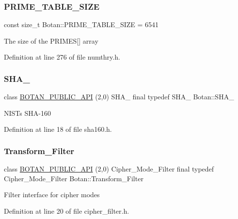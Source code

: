 \subsubsection{\texorpdfstring{P\+R\+I\+M\+E\+\_\+\+T\+A\+B\+L\+E\+\_\+\+S\+I\+ZE}{PRIME\_TABLE\_SIZE}}
{\footnotesize\ttfamily const size\+\_\+t Botan\+::\+P\+R\+I\+M\+E\+\_\+\+T\+A\+B\+L\+E\+\_\+\+S\+I\+ZE = 6541}

The size of the P\+R\+I\+M\+ES\mbox{[}\mbox{]} array 

Definition at line 276 of file numthry.\+h.

\mbox{\label{namespace_botan_a7aedf36a60e3180255517925fa25efca}} 
\subsubsection{\texorpdfstring{S\+H\+A\+\_}{SHA\_1}}
{\footnotesize\ttfamily class \mbox{\hyperlink{namespace_botan_a6b9388030d872e586a4655b776ac9501}{B\+O\+T\+A\+N\+\_\+\+P\+U\+B\+L\+I\+C\+\_\+\+A\+PI}} (2,0) S\+H\+A\+\_ final typedef S\+H\+A\+\_ Botan\+::\+S\+H\+A\+\_}

N\+I\+ST\textquotesingle{}s S\+H\+A-\/160 

Definition at line 18 of file sha160.\+h.

\mbox{\label{namespace_botan_a021ffc520728602cd2f027a40b68bc5f}} 
\subsubsection{\texorpdfstring{Transform\+\_\+\+Filter}{Transform\_Filter}}
{\footnotesize\ttfamily class \mbox{\hyperlink{namespace_botan_a6b9388030d872e586a4655b776ac9501}{B\+O\+T\+A\+N\+\_\+\+P\+U\+B\+L\+I\+C\+\_\+\+A\+PI}} (2,0) Cipher\+\_\+\+Mode\+\_\+\+Filter final typedef Cipher\+\_\+\+Mode\+\_\+\+Filter Botan\+::\+Transform\+\_\+\+Filter}

Filter interface for cipher modes 

Definition at line 20 of file cipher\+\_\+filter.\+h.

